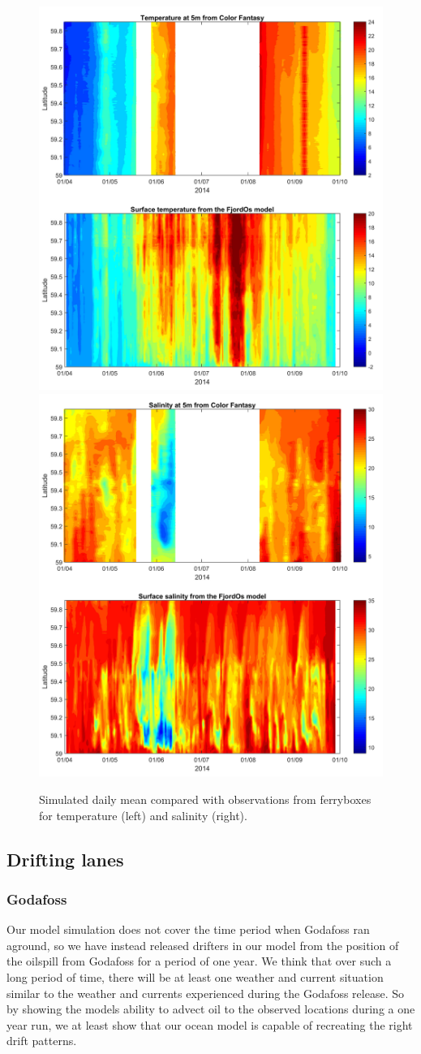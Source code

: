 \begin{figure}[ht]
\centerline{
\includegraphics*[trim=1cm 0cm 1cm 0cm,clip=true,width=.5\textwidth]{Figurer/FjordOs_vs_Ferrybox_TEMP}
\includegraphics*[trim=1cm 0cm 1cm 0cm,clip=true,width=.5\textwidth]{Figurer/FjordOs_vs_Ferrybox_SALT}}
\caption{\small
Simulated daily mean compared with observations from ferryboxes for temperature (left) and salinity (right).}
\label{fig:Ferrybox_temp_salt}
\end{figure}


\clearpage 

\subsection{Drifting lanes}
\subsubsection{Godafoss}
Our model simulation does not cover the time period when Godafoss ran aground, so we have instead released drifters in our model from the position of the oilspill from Godafoss for a period of one year. We think that over such a long period of time, there will be at least one weather and current situation similar to the weather and currents experienced during the Godafoss release. So by showing the models ability to advect oil to the observed locations during a one year run, we at least show that our ocean model is capable of recreating the right drift patterns.

